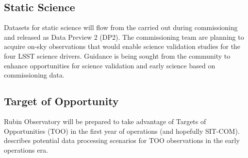\subsection{Static Science}
 
Datasets for static science will flow from the \svs carried out during commissioning and released as Data Preview 2 (DP2). 
The commissioning team are planning to acquire on-sky observations that would enable science validation studies for the four LSST science drivers.
Guidance is being sought from the community to enhance opportunities for science validation and early science  based on commissioning data.

\subsection{Target of Opportunity}

Rubin Observatory will be prepared to take advantage of Targets of Opportunities (TOO) in the first year of operations (and hopefully SIT-COM). 
 describes potential data processing scenarios for TOO observations in the early operations era.